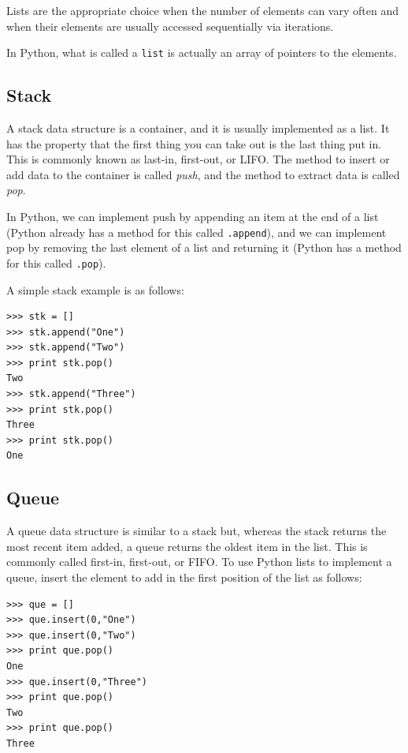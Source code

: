 \documentclass[justified,sixbynine]{tufte-book}
\def\ft{\small\tt}
\theoremstyle{plain}%
\theoremstyle{definition}
\theoremstyle{remark}
\begin{document}
\begin{fullwidth}
Lists are the appropriate choice when the number of elements can vary often and when their elements are usually accessed sequentially via iterations.

In Python, what is called a {\ft list} is actually an array of pointers to the elements.

\goodbreak\subsection{Stack}


A stack data structure is a container, and it is usually implemented as a list. It has the property that the first thing you can take out is the last thing put in. This is commonly known as last-in, first-out, or LIFO. The method to insert or add data to the container is called {\it push}, and the method to extract data is called {\it pop}.

In Python, we can implement push by appending an item at the end of a list (Python already has a method for this called {\ft .append}), and we can implement pop by removing the last element of a list and returning it (Python has a method for this called {\ft .pop}).

A simple stack example is as follows:

\begin{lstlisting}
>>> stk = []
>>> stk.append("One")
>>> stk.append("Two")
>>> print stk.pop()
Two
>>> stk.append("Three")
>>> print stk.pop()
Three
>>> print stk.pop()
One
\end{lstlisting}


\goodbreak\subsection{Queue}

A queue data structure is similar to a stack but, whereas the stack returns the most recent item added, a queue returns the oldest item in the list.  This is commonly called first-in, first-out, or FIFO.  To use Python lists to implement a queue, insert the element to add in the first position of the list as follows:

\begin{lstlisting}
>>> que = []
>>> que.insert(0,"One")
>>> que.insert(0,"Two")
>>> print que.pop()
One
>>> que.insert(0,"Three")
>>> print que.pop()
Two
>>> print que.pop()
Three
\end{lstlisting}


\end{fullwidth}
\end{document}
